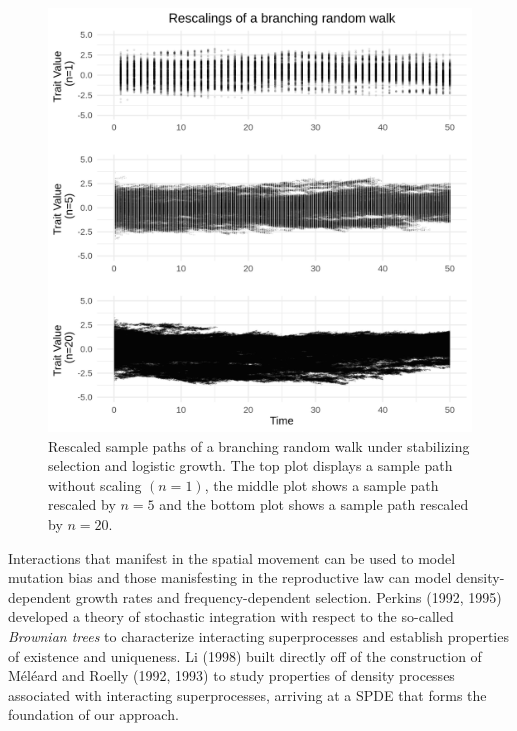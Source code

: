 \documentclass[]{article}
\begin{document}
\begin{figure}

{\centering \includegraphics{rescaled_plots} 

}

\caption{\label{rescaled}Rescaled sample paths of a branching random walk under stabilizing selection and logistic growth. The top plot displays a sample path without scaling $(n=1)$, the middle plot shows a sample path rescaled by $n=5$ and the bottom plot shows a sample path rescaled by $n=20$.}\label{fig:unnamed-chunk-4}
\end{figure}

Interactions that manifest in the spatial movement can be used to model
mutation bias and those manisfesting in the reproductive law can model
density-dependent growth rates and frequency-dependent selection.
Perkins (1992, 1995) developed a theory of stochastic integration with
respect to the so-called \emph{Brownian trees} to characterize
interacting superprocesses and establish properties of existence and
uniqueness. Li (1998) built directly off of the construction of Méléard
and Roelly (1992, 1993) to study properties of density processes
associated with interacting superprocesses, arriving at a SPDE that
forms the foundation of our approach.
\end{document}
